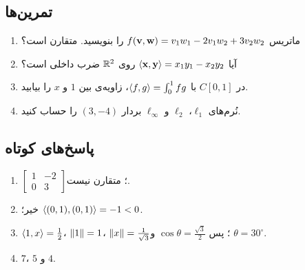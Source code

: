 \subsection*{تمرین‌ها}
\begin{enumerate}
  \item ماتریس $f(\mathbf{v},\mathbf{w})=v_1w_1-2v_1w_2+3v_2w_2$ را بنویسید. متقارن است؟
  \item آیا $\left\langle \mathbf{x},\mathbf{y}\right\rangle=x_1y_1-x_2y_2$ روی $\mathbb{R}^2$ ضرب داخلی است؟
  \item در $C[0,1]$ با $\left\langle f,g\right\rangle=\int_0^1fg$، زاویه‌ی بین $1$ و $x$ را بیابید.
  \item نُرم‌های $\ell_1$، $\ell_2$ و $\ell_\infty$ بردار $(3,-4)$ را حساب کنید.
\end{enumerate}

\subsection*{پاسخ‌های کوتاه}
\begin{enumerate}
  \item $\begin{bmatrix}1&-2\\0&3\end{bmatrix}$؛ متقارن نیست.
  \item خیر؛ $\left\langle (0,1),(0,1)\right\rangle=-1<0$.
  \item $\left\langle 1,x\right\rangle=\frac12$، $\left\lVert 1\right\rVert=1$، $\left\lVert x\right\rVert=\frac1{\sqrt3}$؛ پس $\cos\theta=\frac{\sqrt3}2$ و $\theta=30^\circ$.
  \item $7$، $5$ و $4$.
\end{enumerate}
